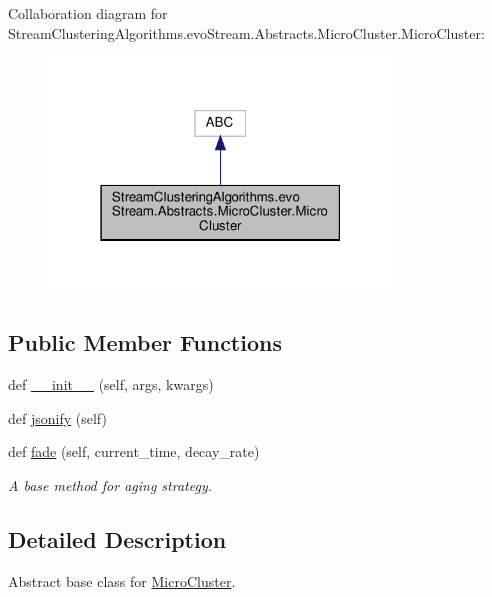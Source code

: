 Collaboration diagram for Stream\+Clustering\+Algorithms.\+evo\+Stream.\+Abstracts.\+Micro\+Cluster.\+Micro\+Cluster\+:\nopagebreak
\begin{figure}[H]
\begin{center}
\leavevmode
\includegraphics[width=259pt]{classStreamClusteringAlgorithms_1_1evoStream_1_1Abstracts_1_1MicroCluster_1_1MicroCluster__coll__graph}
\end{center}
\end{figure}
\subsection*{Public Member Functions}
\begin{DoxyCompactItemize}
\item 
def \hyperlink{classStreamClusteringAlgorithms_1_1evoStream_1_1Abstracts_1_1MicroCluster_1_1MicroCluster_a3fe909ae28331a372ae182dc210e6b1e}{\+\_\+\+\_\+init\+\_\+\+\_\+} (self, args, kwargs)
\item 
def \hyperlink{classStreamClusteringAlgorithms_1_1evoStream_1_1Abstracts_1_1MicroCluster_1_1MicroCluster_a039c2ba63997e742f0a9947340263745}{jsonify} (self)
\item 
def \hyperlink{classStreamClusteringAlgorithms_1_1evoStream_1_1Abstracts_1_1MicroCluster_1_1MicroCluster_a617f5dcc1bf93101755257ecd364bbcf}{fade} (self, current\+\_\+time, decay\+\_\+rate)
\begin{DoxyCompactList}\small\item\em A base method for aging strategy. \end{DoxyCompactList}\end{DoxyCompactItemize}


\subsection{Detailed Description}
Abstract base class for \hyperlink{classStreamClusteringAlgorithms_1_1evoStream_1_1Abstracts_1_1MicroCluster_1_1MicroCluster}{Micro\+Cluster}. 

